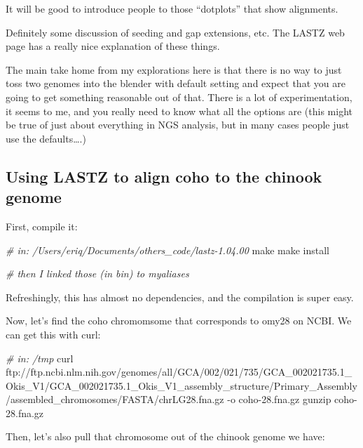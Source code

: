 \documentclass[]{krantz}
\makeatletter
\newenvironment{Shaded}{\begin{snugshade}}{\end{snugshade}}
\newcommand{\CommentTok}[1]{\textcolor[rgb]{0.37,0.37,0.37}{\textit{#1}}}
\newcommand{\ExtensionTok}[1]{#1}
\newcommand{\FunctionTok}[1]{\textcolor[rgb]{0,0,0}{#1}}
\newcommand{\NormalTok}[1]{#1}
\newenvironment{kframe}{%
\medskip{}
\setlength{\fboxsep}{.8em}
 \def\at@end@of@kframe{}%
 \ifinner\ifhmode%
  \def\at@end@of@kframe{\end{minipage}}%
  \begin{minipage}{\columnwidth}%
 \fi\fi%
 \def\FrameCommand##1{\hskip\@totalleftmargin \hskip-\fboxsep
 \colorbox{shadecolor}{##1}\hskip-\fboxsep
     \hskip-\linewidth \hskip-\@totalleftmargin \hskip\columnwidth}%
 \MakeFramed {\advance\hsize-\width
   \@totalleftmargin\z@ \linewidth\hsize
   \@setminipage}}%
 {\par\unskip\endMakeFramed%
 \at@end@of@kframe}
\renewenvironment{Shaded}{\begin{kframe}}{\end{kframe}}
\makeatother
\begin{document}
It will be good to introduce people to those ``dotplots'' that show alignments.

Definitely some discussion of seeding and gap extensions, etc. The LASTZ web page has a
really nice explanation of these things.

The main take home from my explorations here is that there is no way to just toss two
genomes into the blender with default setting and expect that you are going to get
something reasonable out of that. There is a lot of experimentation, it seems to me, and
you really need to know what all the options are (this might be true of just about
everything in NGS analysis, but in many cases people just use the defaults\ldots{}.)

\hypertarget{using-lastz-to-align-coho-to-the-chinook-genome}{%
\subsection{Using LASTZ to align coho to the chinook genome}\label{using-lastz-to-align-coho-to-the-chinook-genome}}

First, compile it:

\begin{Shaded}
\begin{Highlighting}[]
\CommentTok{# in: /Users/eriq/Documents/others_code/lastz-1.04.00}
\FunctionTok{make}
\FunctionTok{make}\NormalTok{ install}

\CommentTok{# then I linked those (in bin) to myaliases}
\end{Highlighting}
\end{Shaded}

Refreshingly, this has almost no dependencies, and the compilation is super easy.

Now, let's find the coho chromomsome that corresponds to omy28 on NCBI. We can get this
with curl:

\begin{Shaded}
\begin{Highlighting}[]
\CommentTok{# in: /tmp}
\ExtensionTok{curl}\NormalTok{ ftp://ftp.ncbi.nlm.nih.gov/genomes/all/GCA/002/021/735/GCA_002021735.1_Okis_V1/GCA_002021735.1_Okis_V1_assembly_structure/Primary_Assembly/assembled_chromosomes/FASTA/chrLG28.fna.gz -o coho-28.fna.gz}
\FunctionTok{gunzip}\NormalTok{ coho-28.fna.gz}
\end{Highlighting}
\end{Shaded}

Then, let's also pull that chromosome out of the chinook genome we have:
\end{document}
